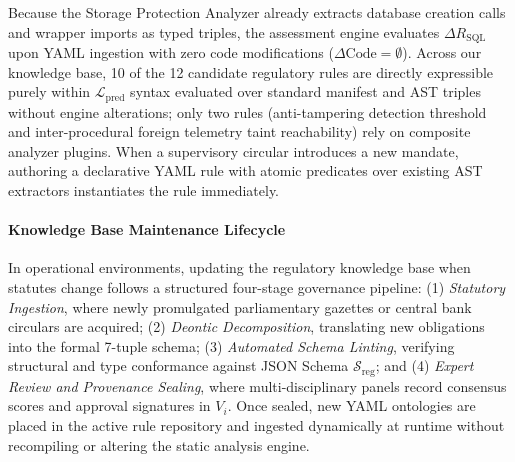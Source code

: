 Because the Storage Protection Analyzer already extracts database creation calls and wrapper imports as typed triples, the assessment engine evaluates $\Delta R_{\text{SQL}}$ upon YAML ingestion with zero code modifications ($\Delta \text{Code} = \emptyset$). Across our knowledge base, 10 of the 12 candidate regulatory rules are directly expressible purely within $\mathcal{L}_{\text{pred}}$ syntax evaluated over standard manifest and AST triples without engine alterations; only two rules (anti-tampering detection threshold and inter-procedural foreign telemetry taint reachability) rely on composite analyzer plugins. When a supervisory circular introduces a new mandate, authoring a declarative YAML rule with atomic predicates over existing AST extractors instantiates the rule immediately.

\paragraph{Knowledge Base Maintenance Lifecycle} In operational environments, updating the regulatory knowledge base when statutes change follows a structured four-stage governance pipeline: (1) \textit{Statutory Ingestion}, where newly promulgated parliamentary gazettes or central bank circulars are acquired; (2) \textit{Deontic Decomposition}, translating new obligations into the formal 7-tuple schema; (3) \textit{Automated Schema Linting}, verifying structural and type conformance against JSON Schema $\mathcal{S}_{\text{reg}}$; and (4) \textit{Expert Review and Provenance Sealing}, where multi-disciplinary panels record consensus scores and approval signatures in $V_i$. Once sealed, new YAML ontologies are placed in the active rule repository and ingested dynamically at runtime without recompiling or altering the static analysis engine.
